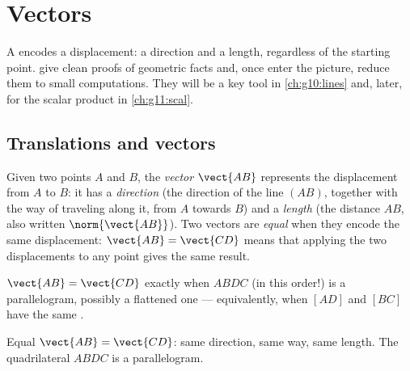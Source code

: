 \chapter{Vectors}\label{ch:g10:vectors}

A  encodes a displacement: a direction and a length, regardless of
the starting point.  give clean proofs of geometric facts and, once
 enter the picture, reduce them to small computations. They
will be a key tool in \cref{ch:g10:lines} and, later, for the scalar
product in \cref{ch:g11:scal}.

\section{Translations and vectors}

\begin{definition}[Vector]\label{def:g10:vectors:vector}
Given two points $A$ and $B$, the \emph{vector} $\vect{AB}$
represents the displacement from $A$ to $B$: it has a
\emph{direction} (the direction of the line $(AB)$, together with the way
of traveling along it, from $A$ towards $B$) and a
\emph{length} (the distance $AB$, also written $\norm{\vect{AB}}$).
Two vectors are \emph{equal} when they encode the same displacement:
$\vect{AB} = \vect{CD}$ means that applying the two displacements to any
point gives the same result.
\end{definition}

\begin{proposition}\label{prop:g10:vectors:parallelogram}
$\vect{AB} = \vect{CD}$ exactly when $ABDC$ (in this order!) is a
parallelogram, possibly a flattened one --- equivalently, when $[AD]$ and
$[BC]$ have the same .
\end{proposition}
\admitted

\begin{omfigure}

{\small Equal  $\vect{AB} = \vect{CD}$: same direction, same way,
same length. The quadrilateral $ABDC$ is a parallelogram.}
\end{omfigure}

